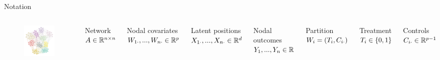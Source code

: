\documentclass{beamer}
\theoremstyle{remark}
\begin{document}
\begin{frame}{Notation}
    \begin{columns}

        \begin{figure}
            \includegraphics[width=\textwidth]{figures/assortative.png}
        \end{figure}


        Network $A \in \mathbb{R}^{n \times n}$

        Nodal covariates $W_{1 \cdot}, ..., W_{n \cdot} \in \mathbb{R}^{p}$

        Latent positions $X_{1 \cdot}, ..., X_{n \cdot} \in \mathbb{R}^d$

        Nodal outcomes $Y_1, ..., Y_n \in \mathbb{R}$

        \vspace{6mm}

        Partition $W_i = (T_i, C_{i \cdot})$

        Treatment $T_i \in \{0, 1\}$

        Controls $C_{i \cdot} \in \mathbb{R}^{p - 1}$

    \end{columns}
\end{frame}
\end{document}
